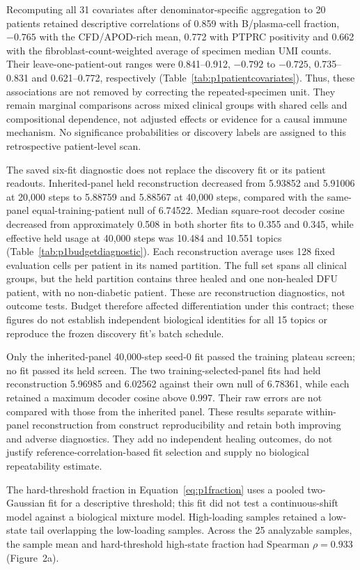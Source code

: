 \documentclass[10pt,a4paper]{article}
\begin{document}
Recomputing all 31 covariates after denominator-specific aggregation to 20 patients retained descriptive correlations of 0.859 with B/plasma-cell fraction, $-0.765$ with the CFD/APOD-rich mean, 0.772 with PTPRC positivity and 0.662 with the fibroblast-count-weighted average of specimen median UMI counts. Their leave-one-patient-out ranges were 0.841--0.912, $-0.792$ to $-0.725$, 0.735--0.831 and 0.621--0.772, respectively (Table~\ref{tab:p1patientcovariates}). Thus, these associations are not removed by correcting the repeated-specimen unit. They remain marginal comparisons across mixed clinical groups with shared cells and compositional dependence, not adjusted effects or evidence for a causal immune mechanism. No significance probabilities or discovery labels are assigned to this retrospective patient-level scan.

The saved six-fit diagnostic does not replace the discovery fit or its patient readouts. Inherited-panel held reconstruction decreased from 5.93852 and 5.91006 at 20,000 steps to 5.88759 and 5.88567 at 40,000 steps, compared with the same-panel equal-training-patient null of 6.74522. Median square-root decoder cosine decreased from approximately 0.508 in both shorter fits to 0.355 and 0.345, while effective held usage at 40,000 steps was 10.484 and 10.551 topics (Table~\ref{tab:p1budgetdiagnostic}). Each reconstruction average uses 128 fixed evaluation cells per patient in its named partition. The full set spans all clinical groups, but the held partition contains three healed and one non-healed DFU patient, with no non-diabetic patient. These are reconstruction diagnostics, not outcome tests. Budget therefore affected differentiation under this contract; these figures do not establish independent biological identities for all 15 topics or reproduce the frozen discovery fit's batch schedule.

Only the inherited-panel 40,000-step seed-0 fit passed the training plateau screen; no fit passed its held screen. The two training-selected-panel fits had held reconstruction 5.96985 and 6.02562 against their own null of 6.78361, while each retained a maximum decoder cosine above 0.997. Their raw errors are not compared with those from the inherited panel. These results separate within-panel reconstruction from construct reproducibility and retain both improving and adverse diagnostics. They add no independent healing outcomes, do not justify reference-correlation-based fit selection and supply no biological repeatability estimate.

\FloatBarrier
The hard-threshold fraction in Equation~\eqref{eq:p1fraction} uses a pooled two-Gaussian fit for a descriptive threshold; this fit did not test a continuous-shift model against a biological mixture model. High-loading samples retained a low-state tail overlapping the low-loading samples. Across the 25 analyzable samples, the sample mean and hard-threshold high-state fraction had Spearman $\rho=0.933$ (Figure~2a\label{call:p1f2}).
\end{document}
